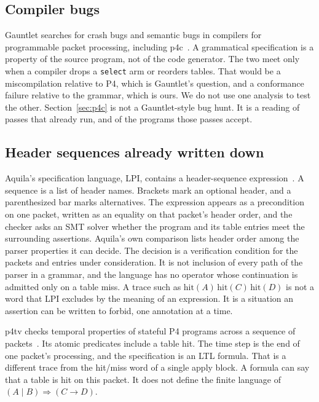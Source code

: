 \documentclass[a4paper,UKenglish,cleveref,autoref]{lipics-v2021}
\begin{document}
\subsection{Compiler bugs}

Gauntlet searches for crash bugs and semantic bugs in compilers for programmable packet processing, including p4c~\cite{gauntlet}.
A grammatical specification is a property of the source program, not of the code generator.
The two meet only when a compiler drops a \texttt{select} arm or reorders tables.
That would be a miscompilation relative to P4, which is Gauntlet's question, and a conformance failure relative to the grammar, which is ours.
We do not use one analysis to test the other.
Section~\ref{sec:p4c} is not a Gauntlet-style bug hunt.
It is a reading of passes that already run, and of the programs those passes accept.

\subsection{Header sequences already written down}

Aquila's specification language, LPI, contains a header-sequence expression~\cite{aquila}.
A sequence is a list of header names.
Brackets mark an optional header, and a parenthesized bar marks alternatives.
The expression appears as a precondition on one packet, written as an equality on that packet's header order, and the checker asks an SMT solver whether the program and its table entries meet the surrounding assertions.
Aquila's own comparison lists header order among the parser properties it can decide.
The decision is a verification condition for the packets and entries under consideration.
It is not inclusion of every path of the parser in a grammar, and the language has no operator whose continuation is admitted only on a table miss.
A trace such as \(\mathrm{hit}(A)\,\mathrm{hit}(C)\,\mathrm{hit}(D)\) is not a word that LPI excludes by the meaning of an expression.
It is a situation an assertion can be written to forbid, one annotation at a time.

p4tv checks temporal properties of stateful P4 programs across a sequence of packets~\cite{p4ltl}.
Its atomic predicates include a table hit.
The time step is the end of one packet's processing, and the specification is an LTL formula.
That is a different trace from the hit/miss word of a single apply block.
A formula can say that a table is hit on this packet.
It does not define the finite language of \((A \mid B) \Rightarrow (C \rightarrow D)\).
\end{document}
